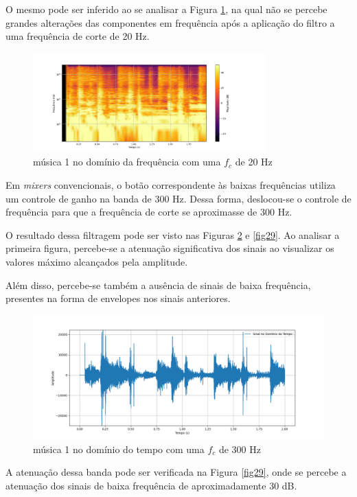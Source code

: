 O mesmo pode ser inferido ao se analisar a Figura \ref{fig25}, na qual não se percebe grandes alterações das componentes em frequência após a aplicação do filtro a uma frequência de corte de 20 Hz.

\begin{figure}[h]
	\centering
    \includegraphics[width=0.8\textwidth]{figuras/fig25.png}
	\caption{música 1 no domínio da frequência com uma $f_c$ de 20 Hz}
	\label{fig25}
\end{figure}

Em \textit{mixers} convencionais, o botão correspondente às baixas frequências utiliza um controle de ganho na banda de 300 Hz. Dessa forma, deslocou-se o controle de frequência para que a frequência de corte se aproximasse de 300 Hz.

O resultado dessa filtragem pode ser visto nas Figuras \ref{fig28} e \ref{fig29}. Ao analisar a primeira figura, percebe-se a atenuação significativa dos sinais ao visualizar os valores máximo alcançados pela amplitude.

Além disso, percebe-se também a ausência de sinais de baixa frequência, presentes na forma de envelopes nos sinais anteriores. 

\begin{figure}[h]
	\centering
    \includegraphics[width=\textwidth]{figuras/fig28.png}
	\caption{música 1 no domínio do tempo com uma $f_c$ de 300 Hz}
	\label{fig28}
\end{figure}

A atenuação dessa banda pode ser verificada na Figura \ref{fig29}, onde se percebe a atenuação dos sinais de baixa frequência de aproximadamente 30 dB.

